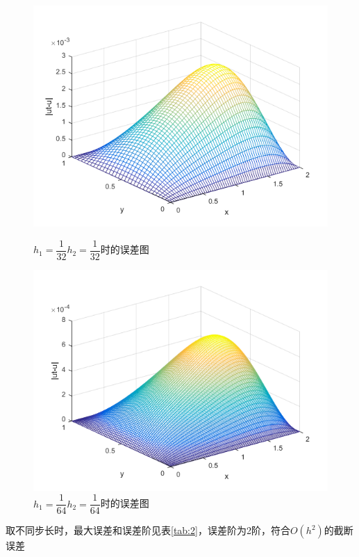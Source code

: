 \documentclass[withoutpreface,bwprint]{cumcmthesis} %
\begin{document}
\begin{figure}[htbp]
\begin{minipage}[htbp]{0.5\linewidth}
		\centering
		\includegraphics[width=1\linewidth]{figures/f5}
		\caption{$h_1=\dfrac{1}{32}$\quad$h_2=\dfrac{1}{32}$时的误差图}
		\label{fig:f5}
	\end{minipage}
	\begin{minipage}[htbp]{0.5\linewidth}
		\centering
		\includegraphics[width=1\linewidth]{figures/f6}
		\caption{$h_1=\dfrac{1}{64}$\quad$h_2=\dfrac{1}{64}$时的误差图}
		\label{fig:f6}
	\end{minipage}
\end{figure}
取不同步长时，最大误差和误差阶见表\ref{tab:2}，误差阶为2阶，符合$O(h^2)$的截断误差
\end{document}
